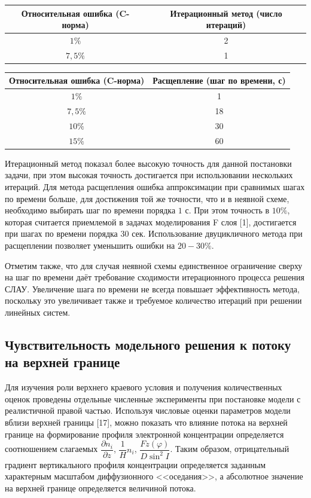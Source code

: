 \documentclass[14pt, a4paper]{extarticle}
\begin{document}
\smallskip

\begin{tabular}{|c|c|}
\hline
Относительная ошибка (C-норма)&Итерационный метод (число итераций)\\
\hline
$1\%$& 2\\
\hline
$7{,}5\%$& 1\\
\hline
\end{tabular}



\begin{tabular}{|c|c|}
\hline
Относительная ошибка (C-норма)&Расщепление (шаг по времени, с)\\
\hline
$1\%$&1\\
\hline
$7{,}5\%$&18\\
\hline
$10\%$&30\\
\hline
$15\%$&60\\
\hline
\end{tabular}

\smallskip

Итерационный метод показал более высокую точность для данной постановки задачи, при этом высокая точность достигается при использовании нескольких итераций. Для метода расщепления ошибка аппроксимации при сравнимых шагах по времени больше, для достижения той же точности, что и в неявной схеме, необходимо выбирать шаг по времени порядка $1$ с. При этом точность в $10\%$, которая считается приемлемой в задачах моделирования F слоя [1], достигается при шагах по времени порядка $30$ сек. Использование двуцикличного метода при расщеплении позволяет уменьшить ошибки на $20-30\%$.

Отметим также, что для случая неявной схемы единственное ограничение сверху на шаг по времени даёт требование сходимости итерационного процесса решения СЛАУ. Увеличение шага по времени не всегда повышает эффективность метода, поскольку это увеличивает также и требуемое количество итераций при решении линейных систем.


\subsection{Чувствительность модельного решения к потоку на верхней границе}
Для изучения роли верхнего краевого условия и получения количественных оценок проведены отдельные численные эксперименты при постановке модели с реалистичной правой частью. Используя числовые оценки параметров модели вблизи верхней границы [17], можно показать что влияние потока на верхней границе на формирование профиля электронной концентрации определяется соотношением слагаемых $\dfrac{\partial n_i}{\partial z}$, $\dfrac{1}{H}n_i$, $\dfrac{Fz(\varphi)}{D\sin^2 I}$. Таким образом, отрицательный градиент вертикального профиля концентрации определяется заданным характерным масштабом диффузионного <<оседания>>, а абсолютное значение на верхней границе определяется величиной потока.
\end{document}
